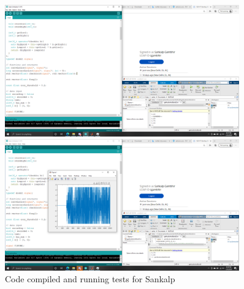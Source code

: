 \begin{figure}[pt]
    \centering
    \includegraphics[width=0.9\textwidth]{fig/sankacompile1.png}

    \includegraphics[width=0.9\textwidth]{fig/sankacompile2.png}
    \caption{Code compiled and running tests for Sankalp}
    \label{fig:sankacompile}
\end{figure}

